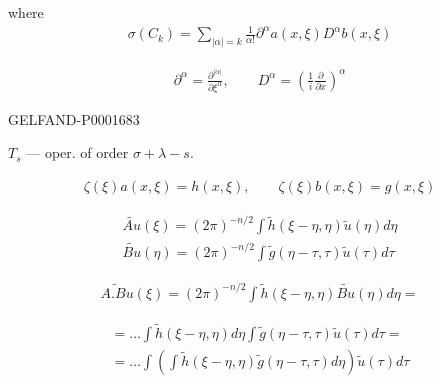 where
\begin{gather*}
\sigma (C_k)=\sum_{|\alpha|=k}\frac{1}{\alpha!}
\partial^\alpha a (x,\xi)D^\alpha b (x,\xi)
\end{gather*}

\begin{gather*}
\partial^\alpha=\frac{\partial^{|\alpha|}}{\partial\xi^\alpha},\qquad
D^\alpha=\left (\frac{1}{i}\frac{\partial}{\partial x}\right)^\alpha
\end{gather*}

\begin{GelfandAdjacentEvidence}{GELFAND-P000168}{3}
\end{GelfandAdjacentEvidence}




$T_s$ — oper. of order $\sigma+\lambda-s$.

\begin{gather*}
\zeta (\xi)a (x,\xi)=h (x,\xi),\qquad
\zeta (\xi)b (x,\xi)=g (x,\xi)
\end{gather*}

\begin{gather*}
\widetilde{Au}(\xi)=(2\pi)^{-n/2}
\int\widetilde h (\xi-\eta,\eta)\widetilde u (\eta)d\eta\\
\widetilde{Bu}(\eta)=(2\pi)^{-n/2}
\int\widetilde g (\eta-\tau,\tau)\widetilde u (\tau)d\tau
\end{gather*}

\begin{gather*}
\widetilde{A. Bu}(\xi)=(2\pi)^{-n/2}
\int\widetilde h (\xi-\eta,\eta)\widetilde{Bu}(\eta)d\eta=
\end{gather*}

\begin{gather*}
=\ldots\int\widetilde h (\xi-\eta,\eta)d\eta
\int\widetilde g (\eta-\tau,\tau)\widetilde u (\tau)d\tau=\\
=\ldots\int\left (\int\widetilde h (\xi-\eta,\eta)
\widetilde g (\eta-\tau,\tau)d\eta\right)\widetilde u (\tau)d\tau
\end{gather*}


